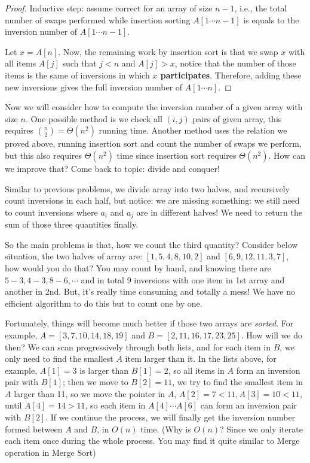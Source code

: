 \begin{spacing}{1.3}
\begin{proof}
        Inductive step: assume correct for an array of size $n-1$, i.e.,
        the total number of swaps performed while insertion sorting
        $A[1\cdots n-1]$ is equals to the inversion number of $A[1\cdots n-1]$.

        Let $x=A[n]$. Now, the remaining work by insertion sort is that we swap 
        $x$ with all items $A[j]$ such that $j<n$ and $A[j]>x$, 
        notice that the number of those items is the same of inversions in which
        {\bf $x$ participates}. Therefore, adding these new inversions gives
        the full inversion number of $A[1\cdots n]$.
    \end{proof}

    Now we will consider how to compute the inversion number of a given 
    array with size $n$. One possible method is we check all $(i,j)$
    pairs of given array, this requires ${n\choose 2}=\Theta(n^2)$
    running time. Another method uses the relation we proved above,
    running insertion sort and count the number of swaps we perform,
    but this also requires $\Theta(n^2)$ time since insertion sort 
    requires $\Theta(n^2)$. How can we improve that? 
    Come back to topic: divide and conquer!

    Similar to previous problems, we divide array into two halves, 
    and recursively count inversions in each half, but notice:
    we are missing something: we still need to count inversions
    where $a_i$ and $a_j$ are in different halves! We need 
    to return the sum of those three quantities finally.

    So the main problems is that, how we count the third quantity?
    Consider below situation, the two halves of array are:
    $[1,5,4,8,10,2]$ and $[6,9,12,11,3,7]$, how would you do that?
    You may count by hand, and knowing there are $5-3, 4-3, 8-6, \cdots$
    and in total 9 inversions with one item in 1st array and another in 
    2nd. But, it's really time consuming and totally a mess! We have 
    no efficient algorithm to do this but to count one by one.

    Fortunately, things will become much better if those two arrays are 
    {\it sorted}. For example, $A=[3,7,10,14,18,19]$ and 
    $B=[2,11,16,17,23,25]$. How will we do then? We can 
    scan progressively through both lists, and for each item 
    in $B$, we only need to find the smallest $A$ item 
    larger than it. In the lists above, for example, $A[1]=3$
    is larger than $B[1]=2$, so all items in $A$ form an inversion pair 
    with $B[1]$; then we move to $B[2]=11$, we try to find the smallest 
    item in $A$ larger than 11, so we move the pointer in $A$, 
    $A[2]=7<11, A[3]=10<11$, until $A[4]=14>11$, so 
    each item in $A[4]\cdots A[6]$ can form an inversion pair with $B[2]$.
    If we continue the process, we will finally get the inversion 
    number formed between $A$ and $B$, in $O(n)$ time. (Why is $O(n)$?
    Since we only iterate each item once during the whole process.
    You may find it quite similar to Merge operation in Merge Sort)


\end{spacing}
